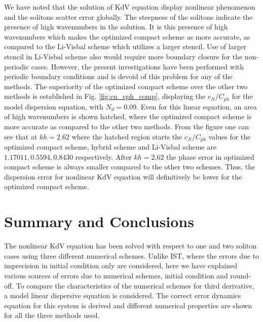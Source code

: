 \documentclass{svjour3}                    %
\begin{document}
We have noted that the solution of KdV equation display nonlinear phenomenon and the solitons scatter error globally. The steepness of the solitons
indicate the presence of high wavenumbers in the solution. It is this presence of high wavenumbers which makes the optimized compact scheme as more 
accurate, as compared to the Li-Visbal scheme which utilizes a larger stencil. Use of larger stencil in Li-Visbal scheme also would require more boundary closure for the non-periodic cases. However, the present investigations have been performed with periodic boundary conditions and is devoid of this problem for any of the methods. The superiority of the optimized compact scheme over the other two methods is established in Fig. \ref{fig:cn_cph_comp}, displaying the $c_N/C_{ph}$ for the model dispersion equation, with $N_d =0.09$. Even for this linear equation, an area of high wavenumbers is shown hatched, where the optimized compact scheme is more accurate as compared to the other two methods. From the figure one can see that at $kh =2.62$ where the hatched region starts the $c_N/C_{ph}$ values for the optimized compact scheme, hybrid scheme and Li-Visbal scheme are $1.17011, 0.5594, 0.8430$ respectively. After $kh =2.62$ the phase error in optimized compact scheme is always smaller compared to the other two schemes. Thus, the dispersion error for nonlinear KdV equation will definitively be lower for the optimized compact scheme.  

\section{Summary and Conclusions}
\label{sec:sum}
The nonlinear KdV equation has been solved with respect to one and two soliton cases using three different numerical schemes. Unlike IST, where the errors due to imprecision in initial condition only are considered, here we have explained various sources of errors due to numerical schemes, initial condition and round-off. To compare the characteristics of the numerical schemes for third derivative, a model linear dispersive equation is considered. The correct error dynamics equation for this system is derived and different numerical properties are shown for all the three methods used.  
\end{document}
